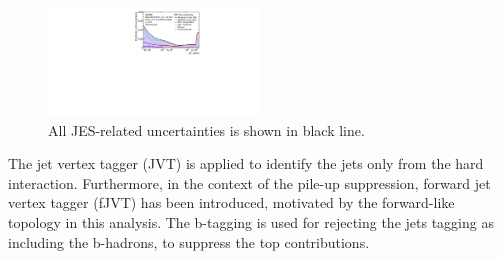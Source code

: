 \begin{figure}[tbp]
    \begin{center}
    \includegraphics[width=0.5\textwidth,keepaspectratio]{figures/Reconstruction/allJES}
    \caption{
    All JES-related uncertainties is shown in black line. \cite{JETM-2018-05}
    }
    \label{fig:in-situcalibration}
    \end{center}
\end{figure}
The jet vertex tagger (JVT) is applied to identify the jets only from the hard interaction. 
Furthermore, in the context of the pile-up suppression, forward jet vertex tagger (fJVT) has been introduced, motivated by the forward-like topology in this analysis.
The b-tagging is used for rejecting the jets tagging as including the b-hadrons, to suppress the top contributions.
